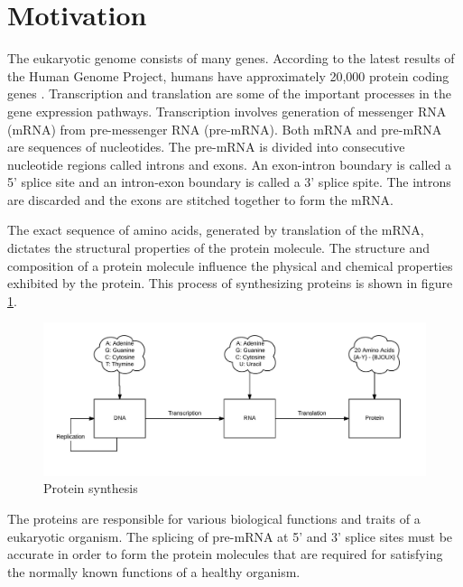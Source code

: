 \documentclass[12pt,a4paper]{article}
\begin{document}
	\tableofcontents
	
	\thispagestyle{empty}
	\newpage
	
	\listoftables
	
	\thispagestyle{empty}
	\newpage
	
	\listoffigures
	
	\thispagestyle{empty}
	\newpage
	
		
	\clearpage
    \doublespacing
	\section{\large Motivation}
    The eukaryotic genome consists of many genes. According to the latest results of the Human Genome Project, humans have approximately 20,000 protein coding genes \cite{gencode}. Transcription and translation are some of the important processes in the gene expression pathways. Transcription involves generation of messenger RNA (mRNA) from pre-messenger RNA (pre-mRNA). Both mRNA and pre-mRNA are sequences of nucleotides. The pre-mRNA is divided into consecutive nucleotide regions called introns and exons. An exon-intron boundary is called a 5’ splice site and an intron-exon boundary is called a 3’ splice spite. The introns are discarded and the exons are stitched together to form the mRNA. \par
    The exact sequence of amino acids, generated by translation of the mRNA, dictates the structural properties of the protein molecule. The structure and composition of a protein molecule influence the physical and chemical properties exhibited by the protein. This process of synthesizing proteins is shown in figure \ref{fig:synthesis_blocks}. \par
	\begin{figure}[h]
		\includegraphics[width=\textwidth]{synthesis}
		\caption{Protein synthesis}
		\centering
		\label{fig:synthesis_blocks}
	\end{figure}
	The proteins are responsible for various biological functions and traits of a eukaryotic organism. The splicing of pre-mRNA at 5’ and 3’ splice sites must be accurate in order to form the protein molecules that are required for satisfying the normally known functions of a healthy organism. \par
\end{document}
